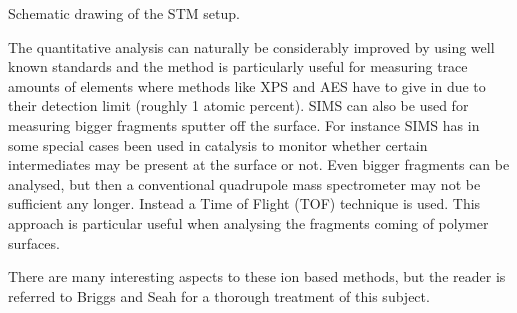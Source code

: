  Schematic drawing of the STM setup.

\vspace{1cm}

The quantitative analysis can naturally be considerably improved by using well known standards and the method is particularly useful for measuring trace amounts of elements where methods like XPS and AES have to give in due to their detection limit (roughly 1 atomic percent). SIMS can also be used for measuring bigger fragments sputter off the surface. For instance SIMS has in some special cases been used in catalysis to monitor whether certain intermediates may be present at the surface or not. Even bigger fragments can be analysed, but then a conventional quadrupole mass spectrometer may not be sufficient any longer. Instead a Time of Flight  (TOF) technique is used. This approach is particular useful when analysing the fragments coming of polymer surfaces.

There are many interesting aspects to these ion based methods, but the reader is referred to Briggs and Seah for a thorough treatment \cite{briggs2} of this subject.